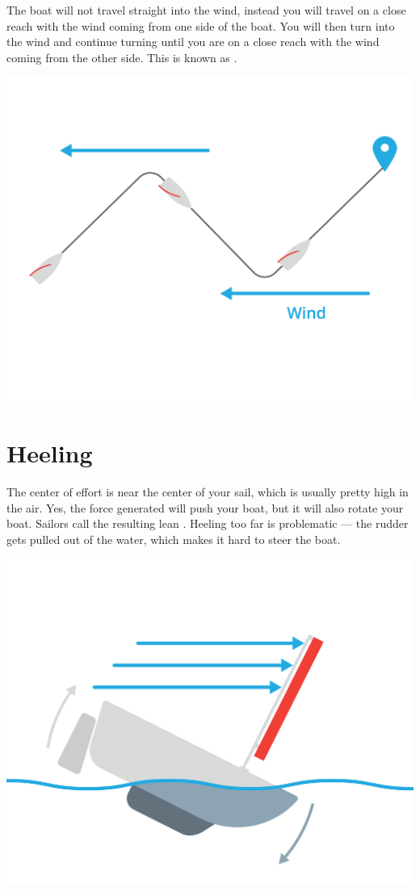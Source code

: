 The boat will not travel straight into the wind,  instead you will travel on a close reach with the wind coming from one side of the boat. You will then turn into the wind and continue turning
until you are on a close reach with the wind coming from the other side.  This is known as .

\includegraphics[width=.75\textwidth]{tacking.png}


\section{Heeling}

The center of effort is near the center of your sail,  which is usually pretty high in the air. Yes, the force generated will push your boat,  but it will also rotate your boat.  Sailors call
the resulting lean . Heeling too far is problematic --- the rudder gets pulled out of the water, which makes it hard to steer the boat.

\includegraphics[width=.75\textwidth]{heeling.png}


